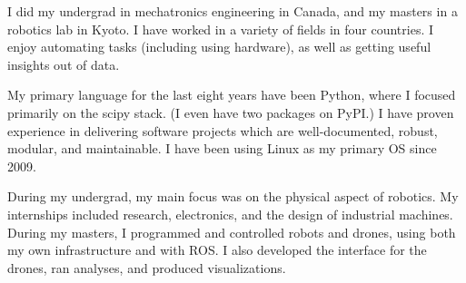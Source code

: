 I did my undergrad in mechatronics engineering in Canada, and my masters in a robotics lab in Kyoto. I have worked in a variety of fields in four countries. I enjoy automating tasks (including using hardware), as well as getting useful insights out of data.

My primary language for the last eight years have been Python, where I focused primarily on the scipy stack. (I even have two packages on PyPI.) I have proven experience in delivering software projects which are well-documented, robust, modular, and maintainable. I have been using Linux as my primary OS since 2009.

During my undergrad, my main focus was on the physical aspect of robotics. My internships included research, electronics, and the design of industrial machines. During my masters, I programmed and controlled robots and drones, using both my own infrastructure and with ROS. I also developed the interface for the drones, ran analyses, and produced visualizations.